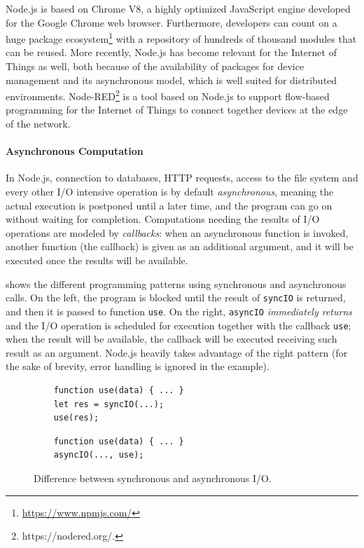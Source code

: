 Node.js is based on Chrome V8, a highly optimized JavaScript engine developed for the Google Chrome web browser. 
Furthermore, developers can count on a huge package ecosystem\footnote{\url{https://www.npmjs.com/}} with a repository of hundreds of thousand modules that can be reused.
More recently, Node.js has become relevant for the Internet of Things as well, both because of the availability of packages for device management and its asynchronous model, which is well suited for distributed environments.
Node-RED\footnote{https://nodered.org/.} is a tool based on Node.js to support flow-based programming for the Internet of Things to
connect together devices at the edge of the network.

\paragraph{Asynchronous Computation}
In Node.js, connection to databases, HTTP requests, access to the file system and every other I/O intensive operation is by default \emph{asynchronous}, meaning the actual execution is postponed until a later time, and the program can go on without waiting for completion.
Computations needing the results of I/O operations are modeled by \emph{callbacks}: when an asynchronous function is invoked, another function (the callback) is given as an additional argument, and it will be executed once the results will be available.

 shows the different programming patterns using synchronous and asynchronous calls.
On the left, the program is blocked until the result of \lstinline{syncIO} is returned, and then it is passed to function \lstinline{use}.
On the right, \lstinline{asyncIO} \emph{immediately returns} and the I/O operation is scheduled for execution together with the callback \lstinline{use}; when the result will be available, the callback will be executed receiving such result as an argument.
Node.js heavily takes advantage of the right pattern (for the sake of brevity, error handling is ignored in the example).

\begin{figure}[h]
\begin{minipage}{.5\textwidth}
\begin{lstlisting}
	function use(data) { ... }
	let res = syncIO(...);
	use(res);
\end{lstlisting}
\end{minipage}
\begin{minipage}{.5\textwidth}
	\begin{lstlisting}
	function use(data) { ... }
	asyncIO(..., use);
	\end{lstlisting}
\end{minipage}
\caption{Difference between synchronous and asynchronous I/O.}
\label{lst:async}
\end{figure}

